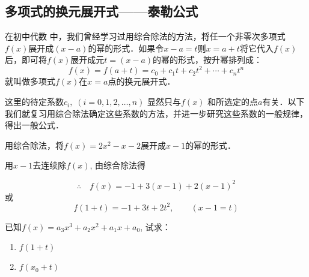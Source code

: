 \subsection{多项式的换元展开式——泰勒公式}

 在初中代数
中，我们曾经学习过用综合除法的方法，将任一个非零次多项式$f(x)$展开成$(x-a)$的幂的形式．如果令$x-a=t$则$x=a+t$将它代入$f(x)$后，即可将$f(x)$展开成元$t=(x-a)$的幂的形式，按升幂排列成：
\[f (x) =f (a+t) =c_0+c_1t+c_2t^2+\cdots+c_nt^n\]
就叫做多项式$f(x)$在$x=a$点的换元展开式．

这里的待定系数$c_i,\; (i=0, 1, 2,\ldots,n)$ 显然只与$f(x)$
和所选定的点$a$有关．以下我们就复习用综合除法确定这些系数的方法，并进一步研究这些系数的一般规律，得出一般公式．

    \begin{example}
        用综合除法，将$f (x) =2x^2-x-2$展开成$x-1$的幂的形式．
    \end{example}    
    
    \begin{solution}
  用$x-1$去连续除$f(x)$, 由综合除法得
\begin{center}
\end{center}

\[\therefore\quad f (x) =-1+3 (x-1) +2 (x-1)^2\]
或
\[f (1+t) =-1+3t+2t^2,\qquad (x-1=t)\]
\end{solution}
   
\begin{example}
已知$f(x)=a_3x^3+a_2x^2+a_1x+a_0$, 试求：
\begin{multicols}{2}
\begin{enumerate}
    \item $f (1+t)$
    \item $f(x_0+t)$
\end{enumerate}
\end{multicols}
\end{example}


